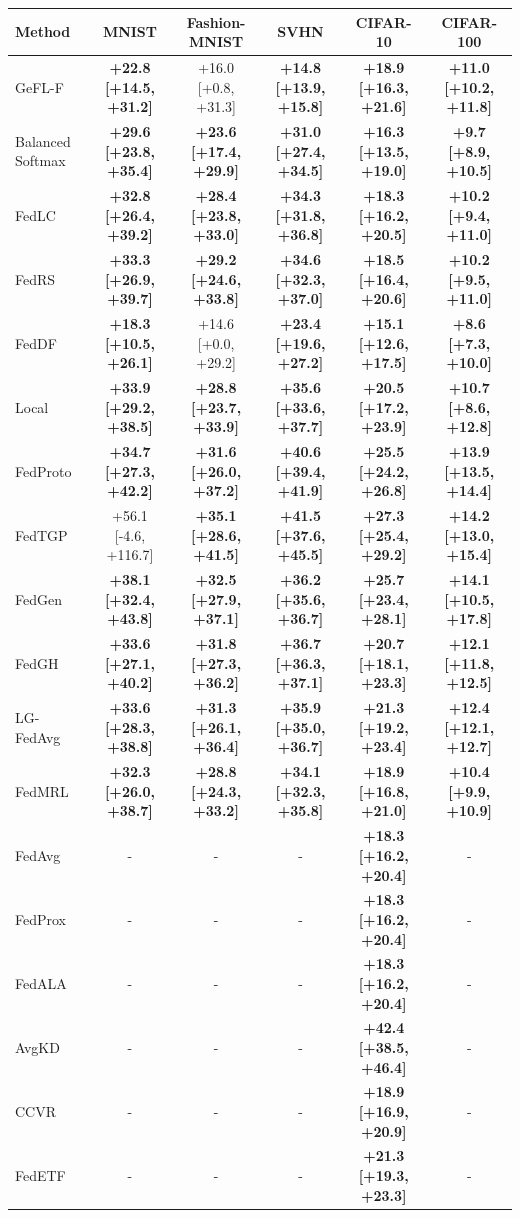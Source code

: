 \begin{tabular}{lccccc}
\toprule
Method & MNIST & Fashion-MNIST & SVHN & CIFAR-10 & CIFAR-100\\
\midrule
GeFL-F & \textbf{+22.8 [+14.5, +31.2]} & +16.0 [+0.8, +31.3] & \textbf{+14.8 [+13.9, +15.8]} & \textbf{+18.9 [+16.3, +21.6]} & \textbf{+11.0 [+10.2, +11.8]}\\
Balanced Softmax & \textbf{+29.6 [+23.8, +35.4]} & \textbf{+23.6 [+17.4, +29.9]} & \textbf{+31.0 [+27.4, +34.5]} & \textbf{+16.3 [+13.5, +19.0]} & \textbf{+9.7 [+8.9, +10.5]}\\
FedLC & \textbf{+32.8 [+26.4, +39.2]} & \textbf{+28.4 [+23.8, +33.0]} & \textbf{+34.3 [+31.8, +36.8]} & \textbf{+18.3 [+16.2, +20.5]} & \textbf{+10.2 [+9.4, +11.0]}\\
FedRS & \textbf{+33.3 [+26.9, +39.7]} & \textbf{+29.2 [+24.6, +33.8]} & \textbf{+34.6 [+32.3, +37.0]} & \textbf{+18.5 [+16.4, +20.6]} & \textbf{+10.2 [+9.5, +11.0]}\\
FedDF & \textbf{+18.3 [+10.5, +26.1]} & +14.6 [+0.0, +29.2] & \textbf{+23.4 [+19.6, +27.2]} & \textbf{+15.1 [+12.6, +17.5]} & \textbf{+8.6 [+7.3, +10.0]}\\
Local & \textbf{+33.9 [+29.2, +38.5]} & \textbf{+28.8 [+23.7, +33.9]} & \textbf{+35.6 [+33.6, +37.7]} & \textbf{+20.5 [+17.2, +23.9]} & \textbf{+10.7 [+8.6, +12.8]}\\
FedProto & \textbf{+34.7 [+27.3, +42.2]} & \textbf{+31.6 [+26.0, +37.2]} & \textbf{+40.6 [+39.4, +41.9]} & \textbf{+25.5 [+24.2, +26.8]} & \textbf{+13.9 [+13.5, +14.4]}\\
FedTGP & +56.1 [-4.6, +116.7] & \textbf{+35.1 [+28.6, +41.5]} & \textbf{+41.5 [+37.6, +45.5]} & \textbf{+27.3 [+25.4, +29.2]} & \textbf{+14.2 [+13.0, +15.4]}\\
FedGen & \textbf{+38.1 [+32.4, +43.8]} & \textbf{+32.5 [+27.9, +37.1]} & \textbf{+36.2 [+35.6, +36.7]} & \textbf{+25.7 [+23.4, +28.1]} & \textbf{+14.1 [+10.5, +17.8]}\\
FedGH & \textbf{+33.6 [+27.1, +40.2]} & \textbf{+31.8 [+27.3, +36.2]} & \textbf{+36.7 [+36.3, +37.1]} & \textbf{+20.7 [+18.1, +23.3]} & \textbf{+12.1 [+11.8, +12.5]}\\
LG-FedAvg & \textbf{+33.6 [+28.3, +38.8]} & \textbf{+31.3 [+26.1, +36.4]} & \textbf{+35.9 [+35.0, +36.7]} & \textbf{+21.3 [+19.2, +23.4]} & \textbf{+12.4 [+12.1, +12.7]}\\
FedMRL & \textbf{+32.3 [+26.0, +38.7]} & \textbf{+28.8 [+24.3, +33.2]} & \textbf{+34.1 [+32.3, +35.8]} & \textbf{+18.9 [+16.8, +21.0]} & \textbf{+10.4 [+9.9, +10.9]}\\
FedAvg & - & - & - & \textbf{+18.3 [+16.2, +20.4]} & -\\
FedProx & - & - & - & \textbf{+18.3 [+16.2, +20.4]} & -\\
FedALA & - & - & - & \textbf{+18.3 [+16.2, +20.4]} & -\\
AvgKD & - & - & - & \textbf{+42.4 [+38.5, +46.4]} & -\\
CCVR & - & - & - & \textbf{+18.9 [+16.9, +20.9]} & -\\
FedETF & - & - & - & \textbf{+21.3 [+19.3, +23.3]} & -\\
\bottomrule
\end{tabular}
